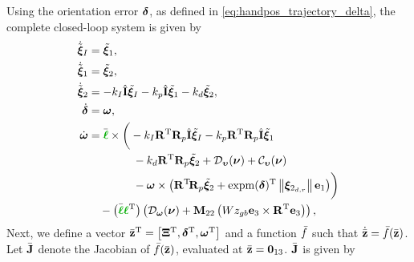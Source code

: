Using the orientation error $\bm{\delta}$, as defined in \eqref{eq:handpos_trajectory_delta}, the complete closed-loop system is given by
\begin{subequations}
    \begin{align}
        \dot{\tilde{\bs{\xi}}}_I &= \tilde{\bs{\xi}}_1, \\
        \dot{\tilde{\bs{\xi}}}_1 &= \tilde{\bs{\xi}}_2, \\
        \dot{\tilde{\bs{\xi}}}_2 &= -k_I \hat{\mat{I}} \tilde{\bs{\xi}}_I - k_p \hat{\mat{I}} \tilde{\bs{\xi}}_1 - k_d \tilde{\bs{\xi}}_2, \\
        \dot{\bs{\delta}} &= \bs{\omega}, \\
        \dot{\bs{\omega}} &= \Bar{\dm{\handl}} \times \bigg(-k_I \mathbf{R}\T \mat{R}_p \hat{\mat{I}} \tilde{\bs{\xi}}_I - k_p \mathbf{R}\T \mat{R}_p \hat{\mat{I}} \tilde{\bs{\xi}}_1 \nonumber \\
        &\qquad \qquad - k_d \mathbf{R}\T \mat{R}_p \tilde{\bs{\xi}}_2 + \mathcal{D}_{\bvel}(\vel) + \mathcal{C}_{\bvel}(\vel) \nonumber \\
        &\qquad \qquad - \bs{\omega} \times \left(\mathbf{R}\T\! \mat{R}_p \tilde{\bs{\xi}}_2 + {\rm expm}(\bs{\delta})\T \norm{\bs{\xi}_{2_{d,r}}}\mat{e}_1\right)\!\bigg) \nonumber \\
        &\quad - \left(\Bar{\dm{\handl}}\dm{\handl}\T\right) \left(\mathcal{D}_{\bs{\omega}}(\vel) + \mat{M}_{22}\left(Wz_{gb} \mat{e}_3 \times \mathbf{R}\T \mat{e}_3\right)\right),
    \end{align}
\end{subequations}
Next, we define a vector $\Bar{\mathbf{z}}^{\mathrm{T}} = \left[\bm{\Xi}^{\mathrm{T}}, \bm{\delta}^{\mathrm{T}}, \bm{\omega}^{\mathrm{T}}\right]$ and a function $\Bar{f}$ such that $\dot{\Bar{\mathbf{z}}} = \Bar{f}(\Bar{\mathbf{z}})$.
Let $\Bar{\mathbf{J}}$ denote the Jacobian of $\Bar{f}(\Bar{\mathbf{z}})$, evaluated at $\Bar{\mathbf{z}} = \mathbf{0}_{13}$.
$\Bar{\mathbf{J}}$ is given by


